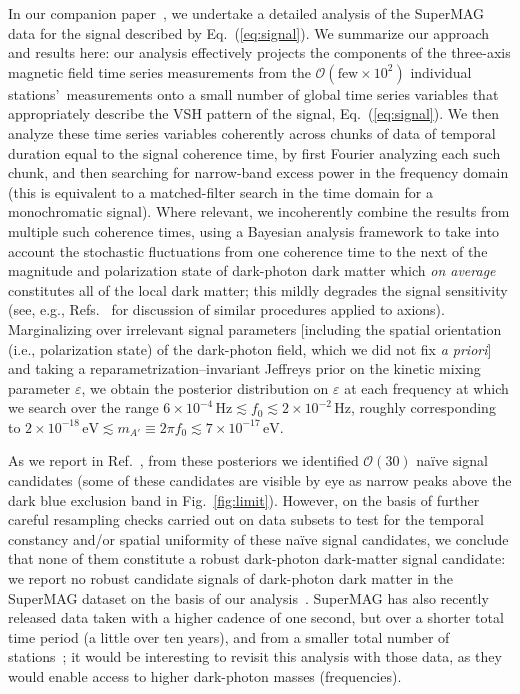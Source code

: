 \documentclass[amsmath,amssymb,aps,10pt,prd,letterpaper,nofootinbib,balancelastpage,notitlepage,superscriptaddress,twocolumn,floatfix]{revtex4-2}
\newcommand{\figref}[2][]{Fig{#1}.~\ref{#2}}		%
\renewcommand{\eqref}[2][]{Eq{#1}.~(\ref{eq:#2})}	%
\newcommand{\citeR}[2][]{Ref{#1}.~\cite{#2}}		%
\newcommand{\Hz}{\,\textrm{Hz}}
\newcommand{\eV}{\,\textrm{eV}}
\begin{document}
In our companion paper~\cite{Fedderke:2021qva}, we undertake a detailed analysis of the SuperMAG data for the signal described by \eqref{signal}.
We summarize our approach and results here:
our analysis effectively projects the components of the three-axis magnetic field time series measurements from the $\mathcal{O}(\text{few} \times 10^2)$ individual stations'~measurements onto a small number of global time series variables that appropriately describe the VSH pattern of the signal, \eqref{signal}.
We then analyze these time series variables coherently across chunks of data of temporal duration equal to the signal coherence time, by first Fourier analyzing each such chunk, and then searching for narrow-band excess power in the frequency domain (this is equivalent to a matched-filter search in the time domain for a monochromatic signal).
Where relevant, we incoherently combine the results from multiple such coherence times, using a Bayesian analysis framework to take into account the stochastic fluctuations from one coherence time to the next of the magnitude and polarization state of dark-photon dark matter which \emph{on average} constitutes all of the local dark matter; this mildly degrades the signal sensitivity (see, e.g., \citeR[s]{Centers:2019dyn,roussy2021experimental,Lisanti:2021vij,Gramolin:2021mqv} for discussion of similar procedures applied to axions). 
Marginalizing over irrelevant signal parameters [including the spatial orientation (i.e., polarization state) of the dark-photon field, which we did not fix \emph{a priori}] and taking a reparametrization--invariant Jeffreys prior on the kinetic mixing parameter $\varepsilon$, we obtain the posterior distribution on $\varepsilon$ at each frequency at which we search over the range $6\times 10^{-4}\Hz \lesssim f_{0} \lesssim 2\times 10^{-2}\Hz$, roughly corresponding to $2\times 10^{-18}\eV \lesssim m_{A'} \equiv 2\pi f_0 \lesssim 7\times 10^{-17}\eV$.

As we report in \citeR{Fedderke:2021qva}, from these posteriors we identified $\mathcal{O}(30)$ na\"ive signal candidates (some of these candidates are visible by eye as narrow peaks above the dark blue exclusion band in \figref{fig:limit}).
However, on the basis of further careful resampling checks carried out on data subsets to test for the temporal constancy and/or spatial uniformity of these na\"ive signal candidates, we conclude that none of them constitute a robust dark-photon dark-matter signal candidate: we report no robust candidate signals of dark-photon dark matter in the SuperMAG dataset on the basis of our analysis~\cite{Fedderke:2021qva}.
SuperMAG has also recently released data taken with a higher cadence of one second, but over a shorter total time period (a little over ten years), and from a smaller total number of stations~\cite{SuperMAGwebsite}; it would be interesting to revisit this analysis with those data, as they would enable access to higher dark-photon masses (frequencies).
\end{document}
